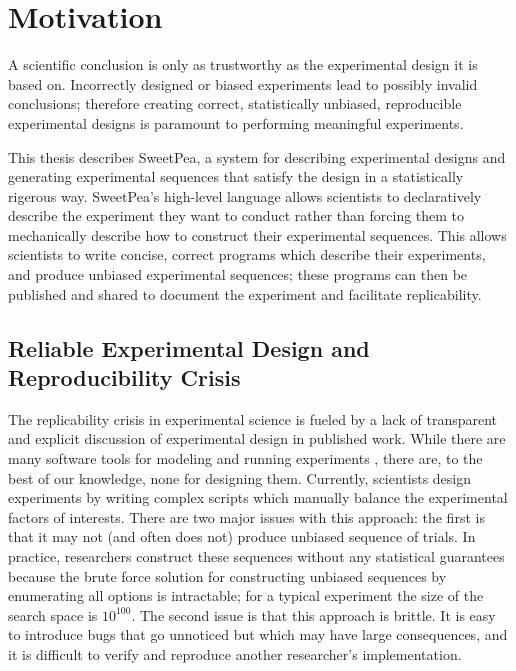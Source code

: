 
\chapter{Motivation}

A scientific conclusion is only as trustworthy as the experimental design it is based on. Incorrectly designed or biased experiments lead to possibly invalid conclusions; therefore creating correct, statistically unbiased, reproducible experimental designs is paramount to performing meaningful experiments.

This thesis describes SweetPea, a system for describing experimental designs and generating experimental sequences that satisfy the design in a statistically rigerous way. SweetPea's high-level language allows scientists to declaratively describe the experiment they want to conduct rather than forcing them to mechanically describe how to construct their experimental sequences. This allows scientists to write concise, correct programs which describe their experiments, and produce unbiased experimental sequences; these programs can then be published and shared to document the experiment and facilitate replicability.

\section{Reliable Experimental Design and Reproducibility Crisis}

The replicability crisis in experimental science is fueled by a lack of transparent and explicit discussion of experimental design in published work. While there are many software tools for modeling and running experiments \cite{cohen1993psyscope} \cite{mathot2012opensesame} \cite{peirce2009generating}, there are, to the best of our knowledge, none for designing them. Currently, scientists design experiments by writing complex scripts which manually balance the experimental factors of interests. There are two major issues with this approach: the first is that it may not (and often does not) produce unbiased sequence of trials. In practice, researchers construct these sequences without any statistical guarantees because the brute force solution for constructing unbiased sequences by enumerating all options is intractable; for a typical experiment the size of the search space is $10^{100}$. The second issue is that this approach is brittle. It is easy to introduce bugs that go unnoticed but which may have large consequences, and it is difficult to verify and reproduce another researcher's implementation.


